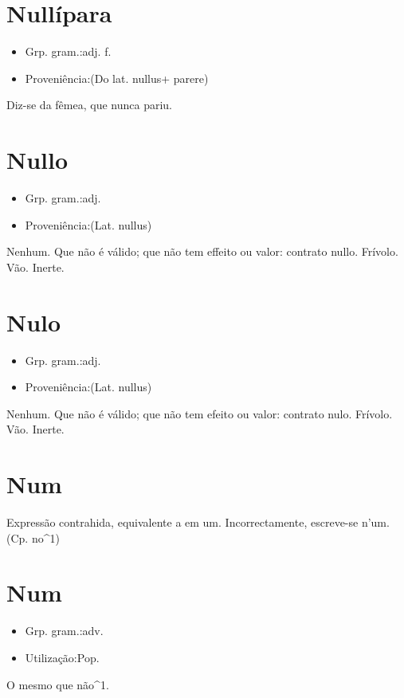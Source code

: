 \section{Nullípara}
\begin{itemize}
\item {Grp. gram.:adj. f.}
\end{itemize}
\begin{itemize}
\item {Proveniência:(Do lat. \textunderscore nullus\textunderscore  + \textunderscore parere\textunderscore )}
\end{itemize}
Diz-se da fêmea, que nunca pariu.
\section{Nullo}
\begin{itemize}
\item {Grp. gram.:adj.}
\end{itemize}
\begin{itemize}
\item {Proveniência:(Lat. \textunderscore nullus\textunderscore )}
\end{itemize}
Nenhum.
Que não é válido; que não tem effeito ou valor: \textunderscore contrato nullo\textunderscore .
Frívolo.
Vão.
Inerte.
\section{Nulo}
\begin{itemize}
\item {Grp. gram.:adj.}
\end{itemize}
\begin{itemize}
\item {Proveniência:(Lat. \textunderscore nullus\textunderscore )}
\end{itemize}
Nenhum.
Que não é válido; que não tem efeito ou valor: \textunderscore contrato nulo\textunderscore .
Frívolo.
Vão.
Inerte.
\section{Num}
Expressão contrahida, equivalente a \textunderscore em um\textunderscore .
Incorrectamente, escreve-se \textunderscore n'um\textunderscore .
(Cp. \textunderscore no\textunderscore ^1)
\section{Num}
\begin{itemize}
\item {Grp. gram.:adv.}
\end{itemize}
\begin{itemize}
\item {Utilização:Pop.}
\end{itemize}
O mesmo que \textunderscore não\textunderscore ^1.
